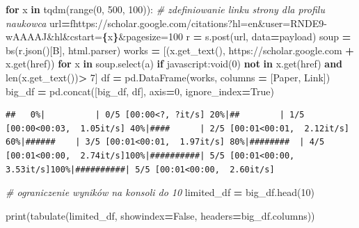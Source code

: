 \documentclass[
  12pt,
]{article}
\newenvironment{Shaded}{\begin{snugshade}}{\end{snugshade}}
\newcommand{\BuiltInTok}[1]{#1}
\newcommand{\CommentTok}[1]{\textcolor[rgb]{0.56,0.35,0.01}{\textit{#1}}}
\newcommand{\ControlFlowTok}[1]{\textcolor[rgb]{0.13,0.29,0.53}{\textbf{#1}}}
\newcommand{\DecValTok}[1]{\textcolor[rgb]{0.00,0.00,0.81}{#1}}
\newcommand{\KeywordTok}[1]{\textcolor[rgb]{0.13,0.29,0.53}{\textbf{#1}}}
\newcommand{\NormalTok}[1]{#1}
\newcommand{\OperatorTok}[1]{\textcolor[rgb]{0.81,0.36,0.00}{\textbf{#1}}}
\newcommand{\SpecialCharTok}[1]{\textcolor[rgb]{0.81,0.36,0.00}{\textbf{#1}}}
\newcommand{\SpecialStringTok}[1]{\textcolor[rgb]{0.31,0.60,0.02}{#1}}
\newcommand{\StringTok}[1]{\textcolor[rgb]{0.31,0.60,0.02}{#1}}
\newcommand{\VariableTok}[1]{\textcolor[rgb]{0.00,0.00,0.00}{#1}}
\begin{document}
\begin{Shaded}
\begin{Highlighting}[]
\ControlFlowTok{for}\NormalTok{ x }\KeywordTok{in}\NormalTok{ tqdm(}\BuiltInTok{range}\NormalTok{(}\DecValTok{0}\NormalTok{, }\DecValTok{500}\NormalTok{, }\DecValTok{100}\NormalTok{)):}
\CommentTok{\# zdefiniowanie linku strony dla profilu naukowca}
\NormalTok{  url}\OperatorTok{=}\SpecialStringTok{f\textquotesingle{}https://scholar.google.com/citations?hl=en\&user=RNDE9{-}wAAAAJ\&hl\&cstart=}\SpecialCharTok{\{}\NormalTok{x}\SpecialCharTok{\}}\SpecialStringTok{\&pagesize=100\textquotesingle{}}
\NormalTok{  r }\OperatorTok{=}\NormalTok{ s.post(url, data}\OperatorTok{=}\NormalTok{payload)}
\NormalTok{  soup }\OperatorTok{=}\NormalTok{ bs(r.json()[}\StringTok{\textquotesingle{}B\textquotesingle{}}\NormalTok{], }\StringTok{\textquotesingle{}html.parser\textquotesingle{}}\NormalTok{)}
\NormalTok{  works }\OperatorTok{=}\NormalTok{ [(x.get\_text(), }\StringTok{\textquotesingle{}https://scholar.google.com\textquotesingle{}} \OperatorTok{+}\NormalTok{ x.get(}\StringTok{\textquotesingle{}href\textquotesingle{}}\NormalTok{)) }
  \ControlFlowTok{for}\NormalTok{ x }\KeywordTok{in}\NormalTok{ soup.select(}\StringTok{\textquotesingle{}a\textquotesingle{}}\NormalTok{) }\ControlFlowTok{if} \StringTok{\textquotesingle{}javascript:void(0)\textquotesingle{}} \KeywordTok{not} \KeywordTok{in}\NormalTok{ x.get(}\StringTok{\textquotesingle{}href\textquotesingle{}}\NormalTok{) }
  \KeywordTok{and} \BuiltInTok{len}\NormalTok{(x.get\_text())}\OperatorTok{\textgreater{}} \DecValTok{7}\NormalTok{]}
\NormalTok{  df }\OperatorTok{=}\NormalTok{ pd.DataFrame(works, columns }\OperatorTok{=}\NormalTok{ [}\StringTok{\textquotesingle{}Paper\textquotesingle{}}\NormalTok{, }\StringTok{\textquotesingle{}Link\textquotesingle{}}\NormalTok{])}
\NormalTok{  big\_df }\OperatorTok{=}\NormalTok{ pd.concat([big\_df, df], axis}\OperatorTok{=}\DecValTok{0}\NormalTok{, ignore\_index}\OperatorTok{=}\VariableTok{True}\NormalTok{)}
\end{Highlighting}
\end{Shaded}

\begin{verbatim}
##   0%|          | 0/5 [00:00<?, ?it/s] 20%|##        | 1/5 [00:00<00:03,  1.05it/s] 40%|####      | 2/5 [00:01<00:01,  2.12it/s] 60%|######    | 3/5 [00:01<00:01,  1.97it/s] 80%|########  | 4/5 [00:01<00:00,  2.74it/s]100%|##########| 5/5 [00:01<00:00,  3.53it/s]100%|##########| 5/5 [00:01<00:00,  2.60it/s]
\end{verbatim}

\begin{Shaded}
\begin{Highlighting}[]
\CommentTok{\# ograniczenie wyników na konsoli do 10}
\NormalTok{limited\_df }\OperatorTok{=}\NormalTok{ big\_df.head(}\DecValTok{10}\NormalTok{)}

\BuiltInTok{print}\NormalTok{(tabulate(limited\_df, showindex}\OperatorTok{=}\VariableTok{False}\NormalTok{, headers}\OperatorTok{=}\NormalTok{big\_df.columns))}
\end{Highlighting}
\end{Shaded}
\end{document}
